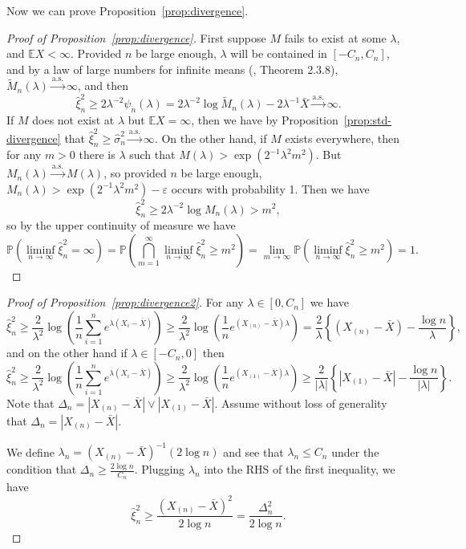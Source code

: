 \documentclass{article}
\theoremstyle{definition}
\newcommand*\eps{\epsilon}
\renewcommand*\epsilon{\varepsilon}
\newcommand{\E}{\mathbb{E}}
\newcommand{\1}{\mathbbm{1}}
\renewcommand{\P}{\mathbb{P}}
\begin{document}
Now we can prove Proposition~\ref{prop:divergence}.
\begin{proof}[Proof of Proposition~\ref{prop:divergence}]
     First suppose $M$ fails to exist at some $\lambda$, and $\E X < \infty$. Provided $n$ be large enough, $\lambda$ will be contained in $[-C_n, C_n]$, and by a law of large numbers for infinite means (\cite{durrett2019probability}, Theorem 2.3.8), $\tilde M_n(\lambda) \xrightarrow{\mathrm{a.s.}} \infty$, and then 
    \[
    \hat \xi_n^2 \geq 2\lambda^{-2}\psi_n(\lambda)  =  2\lambda^{-2}\log \tilde M_n(\lambda)-2\lambda^{-1}\bar X\xrightarrow{\mathrm{a.s.}}\infty.
    \]
    If $M$ does not exist at $\lambda$ but $\E X=\infty$, then we have by Proposition~\ref{prop:std-divergence} that $\hat \xi_n^2 \geq \hat \sigma_n^2\xrightarrow{\mathrm{a.s.}}\infty$.
    On the other hand, if $M$ exists everywhere, then for any $m > 0$ there is $\lambda$ such that $M(\lambda) > \exp(2^{-1}\lambda^2m^2)$. But $M_n(\lambda) \xrightarrow{\mathrm{a.s.}} M(\lambda)$, so provided $n$ be large enough, $M_n(\lambda) > \exp(2^{-1}\lambda^2m^2) - \eps$ occurs with probability 1. Then we have 
    \[
    \hat \xi^2_n \geq 2\lambda^{-2}\log M_n(\lambda) > m^2,
    \]
    so by the upper continuity of measure we have
    \[
    \P\left(\liminf_{n \to \infty} \hat \xi^2_n =\infty\right) = \P\left(\bigcap_{m=1}^\infty \liminf_{n \to \infty} \hat \xi_n^2 \geq m^2\right) = \lim_{m \to \infty} \P\left(\liminf_{n \to \infty}\hat \xi_n^2 \geq m^2\right) = 1.
    \]
\end{proof}


\begin{proof}[Proof of Proposition~\ref{prop:divergence2}]
For any $\lambda \in [0, C_n]$ we have
    \[
    \hat \xi_n^2 \geq \frac{2}{\lambda^2}\log\left(\frac1n\sum_{i=1}^n e^{\lambda(X_i - \bar X)}\right) \geq \frac{2}{\lambda^2}\log \left(\frac1ne^{(X_{(n)} - \bar X)\lambda}\right) = \frac{2}{\lambda}\left\{(X_{(n)} - \bar X)- \frac{\log n}{\lambda}\right\},
    \]
    and on the other hand if $\lambda \in [-C_n, 0]$ then
    \[
    \hat \xi_n^2 \geq \frac{2}{\lambda^2}\log\left(\frac1n\sum_{i=1}^n e^{\lambda(X_i - \bar X)}\right) \geq \frac{2}{\lambda^2}\log \left(\frac1ne^{(X_{(1)} - \bar X)\lambda}\right) \ge \frac{2}{|\lambda|}\left\{|X_{(1)} - \bar X|- \frac{\log n}{|\lambda|}\right\}.
    \]
    Note that $\Delta_n = | X_{(n)} - \bar{X}| \vee |X_{(1)} - \bar{X}|$. Assume without loss of generality that $\Delta_n = | X_{(n)} - \bar{X}|$. 

    We define $\lambda_n = (X_{(n)} - \bar X)^{-1}(2 \log n)$ and see that $\lambda_n \leq C_n$ under the condition that $\Delta_n \geq \frac{2\log n}{C_n}$. Plugging $\lambda_n$ into the RHS of the first inequality, we have
    \[
    \hat \xi_n^2 \geq \frac{(X_{(n)} - \bar X)^2}{2 \log n} = \frac{\Delta_n^2}{2 \log n}.
    \]
\end{proof}
\end{document}
